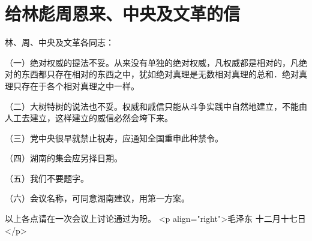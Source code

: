 \section[给林彪周恩来、中央及文革的信（一九六七年十二月十七日）]{给林彪周恩来、中央及文革的信}


林、周、中央及文革各同志：

（一）绝对权威的提法不妥。从来没有单独的绝对权威，凡权威都是相对的，凡绝对的东西都只存在相对的东西之中，犹如绝对真理是无数相对真理的总和．绝对真理只存在于各个相对真理之中一样。

（二）大树特树的说法也不妥。权威和戚信只能从斗争实践中自然地建立，不能由人工去建立，这样建立的威信必然会垮下来。

（三）党中央很早就禁止祝寿，应通知全国重申此种禁令。

（四）湖南的集会应另择日期。

（五）我们不要题字。

（六）会议名称，可同意湖南建议，用第一方案。

以上各点请在一次会议上讨论通过为盼。
<p align="right">毛泽东
十二月十七日</p>



